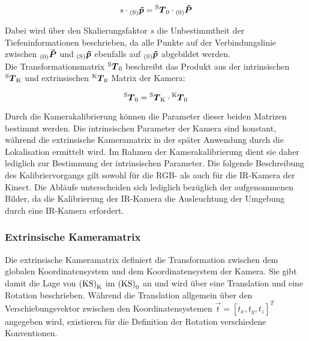 \begin{equation}
s \cdot {_{{\mathrm{(S)}}}}\mbox{\boldmath{$\tilde{p}$}} = {^{\mathrm{S}}\mbox{\boldmath{$T$}}_{\mathrm{0}}} \cdot {_{{\mathrm{(0)}}}}\mbox{\boldmath{$\tilde{P}$}}
\label{eq.persp_abb}
\end{equation}


Dabei wird über den Skalierungsfaktor $s$ die Unbestimmtheit der Tiefeninformationen beschrieben, da alle Punkte auf der Verbindungslinie zwischen ${_{{\mathrm{(0)}}}}\mbox{\boldmath{$\tilde{P}$}}$ und ${_{{\mathrm{(S)}}}}\mbox{\boldmath{$\tilde{p}$}}$ ebenfalls auf ${_{{\mathrm{(S)}}}}\mbox{\boldmath{$\tilde{p}$}}$ abgebildet werden.\\ 
\prever{
}
Die Transformationsmatrix ${^{\mathrm{S}}\mbox{\boldmath{$T$}}_{\mathrm{0}}}$ beschreibt das Produkt aus der intrinsischen ${^{\mathrm{S}}\mbox{\boldmath{$T$}}_{\mathrm{K}}}$ und extrinsischen ${^{\mathrm{K}}\mbox{\boldmath{$T$}}_{\mathrm{0}}}$ Matrix der Kamera:

\begin{equation}
{^{\mathrm{S}}\mbox{\boldmath{$T$}}_{\mathrm{0}}} = {^{\mathrm{S}}\mbox{\boldmath{$T$}}_{\mathrm{K}}} \cdot {^{\mathrm{K}}\mbox{\boldmath{$T$}}_{\mathrm{0}}}
\end{equation}

Durch die Kamerakalibrierung können die Parameter dieser beiden Matrizen bestimmt werden. Die intrinsischen Parameter der Kamera sind konstant, während die extrinsische Kameramatrix in der später Anwendung durch die Lokalisation ermittelt wird. Im Rahmen der Kamerakalibrierung dient sie daher lediglich zur Bestimmung der intrinsischen Parameter. Die folgende Beschreibung des Kalibriervorgangs gilt sowohl für die RGB- als auch für die IR-Kamera der Kinect. Die Abläufe unterscheiden sich lediglich bezüglich der aufgenommenen Bilder, da die Kalibrierung der IR-Kamera die Ausleuchtung der Umgebung durch eine IR-Kamera erfordert.

\subsubsection{Extrinsische Kameramatrix}
\label{chap.perspproj}
\prever{
}
Die extrinsische Kameramatrix definiert die Transformation zwischen dem globalen Koordinatensystem und dem Koordinatensystem der Kamera. Sie gibt damit die Lage von ${\mathrm{(KS)}}_{\mathrm{K}}$ im ${\mathrm{(KS)}}_{\mathrm{0}}$ an und wird über eine Translation und eine Rotation beschrieben. Während die Translation allgemein über den Verschiebungsvektor zwischen den Koordinatensystemen $\vec{t} = [t_x, t_y, t_z]^T$ angegeben wird, existieren für die Definition der Rotation verschiedene Konventionen.\\


